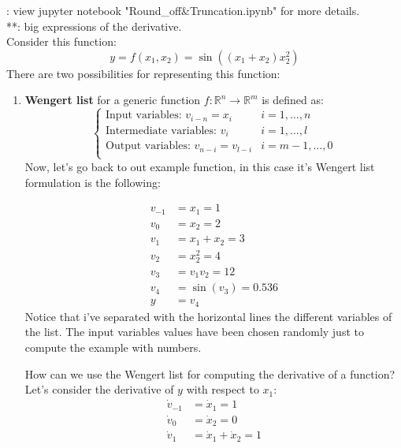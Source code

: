 \noindent*: view jupyter notebook "Round\_off\&Truncation.ipynb" for more details.\\
**: big expressions of the derivative.\\

Consider this function:
\[
    y = f(x_1,x_2) = \sin((x_1 + x_2)x_2^2)     
\]
There are two possibilities for representing this function:
\begin{enumerate}
    \item \textbf{Wengert list} for a generic function $f: \mathbb{R}^n \to \mathbb{R}^m$ is defined as:
    \[
        \begin{cases}
            \text{Input variables: } v_{i-n} = x_i & i = 1, \dots, n\\
            \text{Intermediate variables: } v_i & i = 1, \dots, l\\
            \text{Output variables: } v_{n-i} = v_{l-i} & i = m-1, \dots, 0\\
        \end{cases}    
    \]
    Now, let's go back to out example function, in this case it's Wengert list formulation is the following:
    \begin{multicols}{2}
        \[
            \begin{split}
                v_{-1} &= x_1 = 1\\
                v_0 &= x_2 = 2\\
                \hline
                v_1 &= x_1 + x_2 = 3\\
                v_2 &= x_2^2 = 4\\
                v_3 &= v_1v_2 = 12\\
                v_4 &= \sin(v_3) = 0.536\\
                \hline 
                y &= v_4
            \end{split}    
        \]
        Notice that i've separated with the horizontal lines the different variables of the list. The input variables values have been chosen randomly just to compute the example with numbers.
    \end{multicols}
    How can we use the Wengert list for computing the derivative of a function? Let's consider the derivative of $y$ with respect to $x_1$:
    \[
        \begin{split}
            \dot{v}_{-1} &= \dot{x}_1 = 1\\
            \dot{v}_0 &= \dot{x}_2 = 0\\
            \hline
            \dot{v}_1 &= \dot{x}_1 + \dot{x}_2 = 1\\

\end{split}\]
\end{enumerate}

